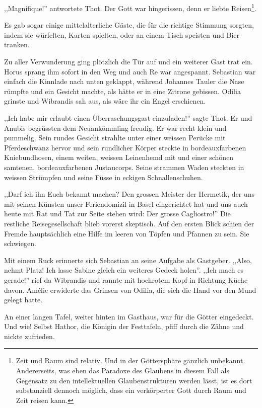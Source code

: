 ,,Magnifique!'' antwortete Thot. Der Gott war hingerissen, denn er liebte Reisen\footnote{Zeit und Raum sind relativ. Und in der Göttersphäre gänzlich unbekannt. Andererseits, was eben das Paradoxe des Glaubens in diesem Fall als Gegensatz zu den intellektuellen Glaubenstrukturen werden lässt, ist es dort substanziell dennoch möglich, dass ein verkörperter Gott durch Raum und Zeit reisen kann.}.

Es gab sogar einige mittelalterliche Gäste, die für die richtige Stimmung sorgten, indem sie würfelten, Karten spielten, oder an einem Tisch speisten und Bier tranken.

Zu aller Verwunderung ging plötzlich die Tür auf und ein weiterer Gast trat ein. Horus sprang ihm sofort in den Weg und auch Re war angespannt. Sebastian war einfach die Kinnlade nach unten geklappt, während Johannes Tauler die Nase rümpfte und ein Gesicht machte, als hätte er in eine Zitrone gebissen. Odilia grinste und Wibrandis sah aus, als wäre ihr ein Engel erschienen.

,,Ich habe mir erlaubt einen Überraschungsgast einzuladen!'' sagte Thot. Er und Anubis begrüssten dem Neuankömmling freudig. Er war recht klein und pummelig. Sein rundes Gesicht strahlte unter einer weissen Perücke mit Pferdeschwanz hervor und sein rundlicher Körper steckte in bordeauxfarbenen Kniebundhosen, einem weiten, weissen Leinenhemd mit  und einer schönen samtenen, bordeauxfarbenen Justaucorps. Seine strammen Waden steckten in weissen Strümpfen und seine Füsse in eckigen Schnallenschuhen.

,,Darf ich ihn Euch bekannt machen? Den grossen Meister der Hermetik, der uns mit seinen Künsten unser Feriendomizil in Basel eingerichtet hat und uns auch heute mit Rat und Tat zur Seite stehen wird: Der grosse Cagliostro!'' Die restliche Reisegesellschaft blieb vorerst skeptisch. Auf den ersten Blick schien der Fremde hauptsächlich eine Hilfe im leeren von Töpfen und Pfannen zu sein. Sie schwiegen.

Mit einem Ruck erinnerte sich Sebastian an seine Aufgabe als Gastgeber. ,,Also, nehmt Platz! Ich lasse Sabine gleich ein weiteres Gedeck holen''. ,,Ich mach es gerade!'' rief da Wibrandis und rannte mit hochrotem Kopf in Richtung Küche davon. Amélie erwiderte das Grinsen von Odilia, die sich die Hand vor den Mund gelegt hatte. 

An einer langen Tafel, weiter hinten im Gasthaus, war für die Götter eingedeckt. Und wie! Selbst Hathor, die Königin der Festtafeln, pfiff durch die Zähne und nickte zufrieden. 

